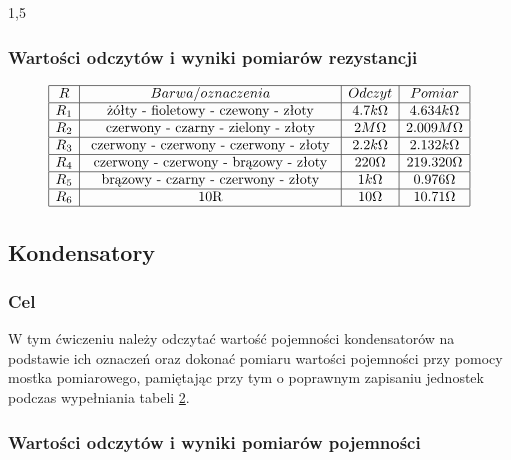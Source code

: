 \documentclass[polish,polish,a4paper]{article}
\begin{document}
	\begin{spacing}{1,5}
		
		\subsubsection*{Wartości odczytów i wyniki pomiarów rezystancji }
		
		
		\begin{equation*}
		\label{eq:tab1}
		\begin{array}{|c|c|c|c|}
		\hline
		R&Barwa/oznaczenia&Odczyt&Pomiar \\ 
		\hline
		R_{1}&$  żółty - fioletowy - czewony - złoty  $ &4.7k \Omega& 4.634 k \Omega  \\ 
		\hline
		R_{2}&$ czerwony - czarny - zielony - złoty $ &2M \Omega& 2.009 M \Omega  \\ 
		\hline
		R_{3}&$ czerwony - czerwony - czerwony - złoty $&2.2k \Omega& 2.132k \Omega  \\ 
		\hline
		R_{4}&$ czerwony - czerwony - brązowy - złoty  $&220 \Omega&219.320 \Omega \\ 
		\hline
		R_{5}&$ brązowy - czarny - czerwony - złoty $&1k \Omega&0.976 \Omega \\ 
		\hline
		R_{6}&$ 10R $&10 \Omega&10.71 \Omega \\ 
		\hline
		\end{array}
		\end{equation*}
		
		\subsection{Kondensatory}
		\subsubsection*{Cel}
		W tym ćwiczeniu należy odczytać wartość pojemności kondensatorów na podstawie ich oznaczeń oraz dokonać
		pomiaru wartości pojemności przy pomocy mostka pomiarowego, pamiętając przy tym o poprawnym
		zapisaniu jednostek podczas wypełniania tabeli \hyperref[eq:tab2]{2}.
		
		\subsubsection*{Wartości odczytów i wyniki pomiarów pojemności}
		

\end{spacing}
\end{document}
